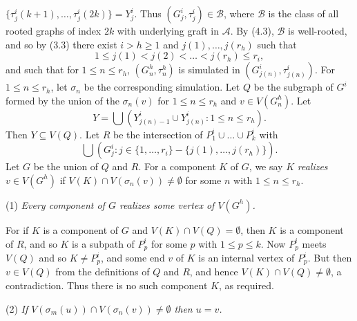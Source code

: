 \noindent $\{\tau^i_j(k+1), \dots, \tau^i_j(2k)\} = Y^i_j$. Thus $(G^i_j, \tau^i_j) \in \mathcal{B}$, where $\mathcal{B}$ is the class of all rooted graphs of index $2k$ with underlying graft in $\mathcal{A}$. By (4.3), $\mathcal{B}$ is well-rooted, and so by (3.3) there exist $i > h \ge 1$ and $j(1), \dots, j(r_h)$ such that
\begin{equation*}
1 \le j(1) < j(2) < \dots < j(r_h) \le r_i,
\end{equation*}
and such that for $1 \le n \le r_h$, $(G^h_n, \tau^h_n)$ is simulated in $(G^i_{j(n)}, \tau^i_{j(n)})$. For $1 \le n \le r_h$, let $\sigma_n$ be the corresponding simulation. Let $Q$ be the subgraph of $G^i$ formed by the union of the $\sigma_n(v)$ for $1 \le n \le r_h$ and $v \in V(G^h_n)$. Let
\begin{equation*}
Y = \bigcup \left(Y^i_{j(n)-1} \cup Y^i_{j(n)} : 1 \le n \le r_h\right).
\end{equation*}
Then $Y \subseteq V(Q)$. Let $R$ be the intersection of $P^i_1 \cup \dots \cup P^i_k$ with
\begin{equation*}
\bigcup (G^i_j : j \in \{1, \dots, r_i\} - \{j(1), \dots, j(r_h)\}).
\end{equation*}
Let $G$ be the union of $Q$ and $R$. For a component $K$ of $G$, we say $K$ \textit{realizes} $v \in V(G^h)$ if $V(K) \cap V(\sigma_n(v)) \ne \emptyset$ for some $n$ with $1 \le n \le r_h$.

\hspace*{12pt}(1) \textit{Every component of $G$ realizes some vertex of $V(G^h)$.}

For if $K$ is a component of $G$ and $V(K) \cap V(Q) = \emptyset$, then $K$ is a component of $R$, and so $K$ is a subpath of $P^i_p$ for some $p$ with $1 \le p \le k$. Now $P^i_p$ meets $V(Q)$ and so $K \ne P^i_p$, and some end $v$ of $K$ is an internal vertex of $P^i_p$. But then $v \in V(Q)$ from the definitions of $Q$ and $R$, and hence $V(K) \cap V(Q) \ne \emptyset$, a contradiction. Thus there is no such component $K$, as required.

\hspace*{12pt}(2) \textit{If $V(\sigma_m(u)) \cap V(\sigma_n(v)) \ne \emptyset$ then $u = v$.}

